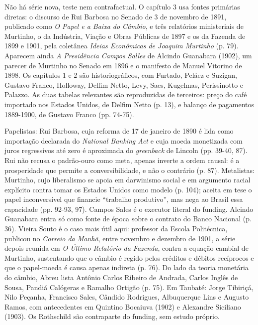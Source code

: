 Não há série nova, teste nem contrafactual. O capítulo 3 usa fontes primárias
diretas: o discurso de Rui Barbosa no Senado de 3 de novembro de 1891, publicado
como \emph{O Papel e a Baixa do Câmbio}, e três relatórios ministeriais de
Murtinho, o da Indústria, Viação e Obras Públicas de 1897 e os da Fazenda de 1899
e 1901, pela coletânea \emph{Ideias Econômicas de Joaquim Murtinho} (p. 79).
Aparecem ainda \emph{A Presidência Campos Salles} de Alcindo Guanabara (1902), um
parecer de Murtinho no Senado em 1896 e o manifesto de Manuel Vitorino de 1898. Os
capítulos 1 e 2 são historiográficos, com Furtado, Peláez e Suzigan, Gustavo
Franco, Holloway, Delfim Netto, Levy, Saes, Kugelmas, Perissinotto e Palazzo. As
duas tabelas relevantes são reproduzidas de terceiros: preço do café importado
nos Estados Unidos, de Delfim Netto (p. 13), e balanço de pagamentos 1889-1900, de
Gustavo Franco (pp. 74-75).

Papelistas: Rui Barbosa, cuja reforma de 17 de janeiro de 1890 é lida como
importação declarada do \emph{National Banking Act} e cuja moeda monetizada com
juros regressivos até zero é aproximada do \emph{greenback} de Lincoln (pp. 39-40,
87). Rui não recusa o padrão-ouro como meta, apenas inverte a ordem causal: é a
prosperidade que permite a conversibilidade, e não o contrário (p. 87).
Metalistas: Murtinho, cujo liberalismo se apoia em darwinismo social e em
argumento racial explícito contra tomar os Estados Unidos como modelo (p. 104);
aceita em tese o papel inconversível que financie ``trabalho produtivo'', mas nega
ao Brasil essa capacidade (pp. 92-93, 97). Campos Sales é o executor literal do
funding. Alcindo Guanabara entra só como fonte de época sobre o contrato do Banco
Nacional (p. 36). Vieira Souto é o caso mais útil aqui: professor da Escola
Politécnica, publicou no \emph{Correio da Manhã}, entre novembro e dezembro de
1901, a série depois reunida em \emph{O Último Relatório da Fazenda}, contra a
equação cambial de Murtinho, sustentando que o câmbio é regido pelos créditos e
débitos recíprocos e que o papel-moeda é causa apenas indireta (p. 76). Do lado da
teoria monetária do câmbio, Abreu lista Antônio Carlos Ribeiro de Andrada, Carlos
Inglês de Sousa, Pandiá Calógeras e Ramalho Ortigão (p. 75). Em Taubaté: Jorge
Tibiriçá, Nilo Peçanha, Francisco Sales, Cândido Rodrigues, Albuquerque Lins e
Augusto Ramos, com antecedentes em Quintino Bocaiuva (1902) e Alexandre Siciliano
(1903). Os Rothschild são contraparte do funding, sem estudo próprio.

